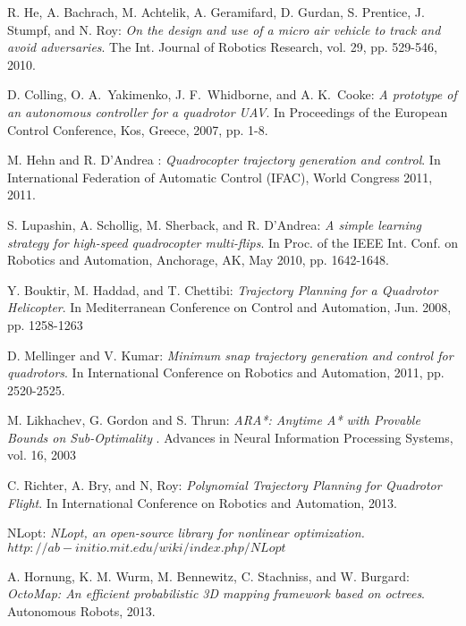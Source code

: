 
\begin{thebibliography}{99}



 {\sc R. He, A. Bachrach, M. Achtelik, A. Geramifard, D. Gurdan, S. Prentice,
J. Stumpf, and N. Roy}: 
{\it On the design and use of a micro air
vehicle to track and avoid adversaries}. The Int. Journal of Robotics
Research, vol. 29, pp. 529-546, 2010.


 {\sc D. Colling, O. A.~Yakimenko, J. F.~Whidborne, and A. K.~Cooke}:
{\it A prototype of an autonomous controller for a quadrotor UAV}. In
Proceedings of the European Control Conference, Kos, Greece, 2007,
pp. 1-8.


 {\sc M. Hehn and R. D'Andrea }:
{\it Quadrocopter trajectory generation and control}. In
International Federation of Automatic Control (IFAC), World Congress 2011, 2011.


 {\sc S. Lupashin, A. Schollig, M. Sherback, and R. D'Andrea}:
 {\it A simple learning strategy for high-speed quadrocopter multi-flips}.
In Proc. of the IEEE Int. Conf. on Robotics and Automation, Anchorage, AK,
May 2010, pp. 1642-1648.


 {\sc Y. Bouktir, M. Haddad, and T. Chettibi}:
{\it Trajectory Planning for a
Quadrotor Helicopter}. In Mediterranean Conference on Control and
Automation, Jun. 2008, pp. 1258-1263


 {\sc D. Mellinger and V. Kumar}: 
{\it Minimum snap trajectory generation and
control for quadrotors}. In International Conference on Robotics and
Automation, 2011, pp. 2520-2525.

 {\sc M. Likhachev, G. Gordon and S. Thrun}: 
{\it  ARA*: Anytime A* with Provable Bounds on Sub-Optimality }.
Advances in Neural Information
Processing Systems, vol. 16, 2003

 {\sc C. Richter,  A. Bry, and N, Roy}: 
{\it  Polynomial Trajectory Planning
for Quadrotor Flight}.
In International Conference on Robotics and
Automation, 2013.

 {\sc NLopt}: 
{\it NLopt, an open-source library for nonlinear optimization.}\newline
\href{http://ab-initio.mit.edu/wiki/index.php/NLopt}{$http://ab-initio.mit.edu/wiki/index.php/NLopt$}

 {\sc A. Hornung, K. M. Wurm, M. Bennewitz, C. Stachniss, and W. Burgard}: 
{\it OctoMap: An efficient probabilistic 3D mapping framework based on octrees}.
Autonomous Robots, 2013.


\end{thebibliography}
